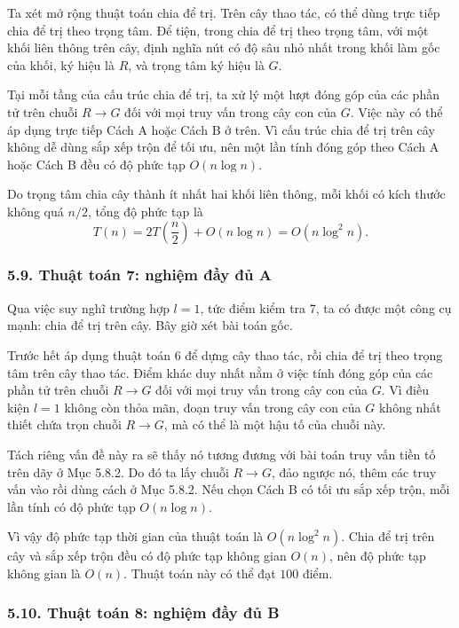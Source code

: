 \documentclass[11pt]{article}
\begin{document}
Ta xét mở rộng thuật toán chia để trị. Trên cây thao tác, có thể dùng trực
tiếp chia để trị theo trọng tâm. Để tiện, trong chia để trị theo trọng tâm,
với một khối liên thông trên cây, định nghĩa nút có độ sâu nhỏ nhất trong
khối làm gốc của khối, ký hiệu là \(R\), và trọng tâm ký hiệu là \(G\).

Tại mỗi tầng của cấu trúc chia để trị, ta xử lý một lượt đóng góp của các phần
tử trên chuỗi \(R\to G\) đối với mọi truy vấn trong cây con của \(G\). Việc này
có thể áp dụng trực tiếp Cách A hoặc Cách B ở trên. Vì cấu trúc chia để trị
trên cây không dễ dùng sắp xếp trộn để tối ưu, nên một lần tính đóng góp theo
Cách A hoặc Cách B đều có độ phức tạp \(O(n\log n)\).

Do trọng tâm chia cây thành ít nhất hai khối liên thông, mỗi khối có kích
thước không quá \(n/2\), tổng độ phức tạp là
\[
  T(n)=2T\left(\frac n2\right)+O(n\log n)=O(n\log^2 n).
\]

\subsubsection*{5.9. Thuật toán 7: nghiệm đầy đủ A}

Qua việc suy nghĩ trường hợp \(l=1\), tức điểm kiểm tra 7, ta có được một công
cụ mạnh: chia để trị trên cây. Bây giờ xét bài toán gốc.

Trước hết áp dụng thuật toán 6 để dựng cây thao tác, rồi chia để trị theo
trọng tâm trên cây thao tác. Điểm khác duy nhất nằm ở việc tính đóng góp của
các phần tử trên chuỗi \(R\to G\) đối với mọi truy vấn trong cây con của \(G\).
Vì điều kiện \(l=1\) không còn thỏa mãn, đoạn truy vấn trong cây con của \(G\)
không nhất thiết chứa trọn chuỗi \(R\to G\), mà có thể là một hậu tố của chuỗi
này.

Tách riêng vấn đề này ra sẽ thấy nó tương đương với bài toán truy vấn tiền tố
trên dãy ở Mục 5.8.2. Do đó ta lấy chuỗi \(R\to G\), đảo ngược nó, thêm các
truy vấn vào rồi dùng cách ở Mục 5.8.2. Nếu chọn Cách B có tối ưu sắp xếp
trộn, mỗi lần tính có độ phức tạp \(O(n\log n)\).

Vì vậy độ phức tạp thời gian của thuật toán là \(O(n\log^2 n)\). Chia để trị
trên cây và sắp xếp trộn đều có độ phức tạp không gian \(O(n)\), nên độ phức
tạp không gian là \(O(n)\). Thuật toán này có thể đạt \(100\) điểm.

\subsubsection*{5.10. Thuật toán 8: nghiệm đầy đủ B}
\end{document}
